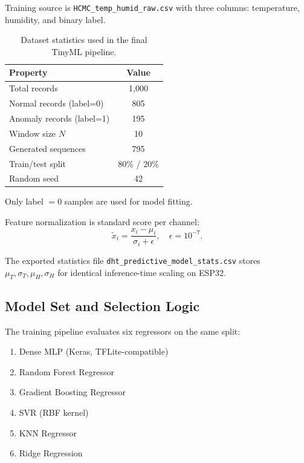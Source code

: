 Training source is \texttt{HCMC\_temp\_humid\_raw.csv} with three
columns: temperature, humidity, and binary label.

\begin{table}[H]
\centering
\caption{Dataset statistics used in the final TinyML pipeline.}
\label{tab:data-stats}
\renewcommand{\arraystretch}{1.25}
\begin{tabular}{l c}
    \toprule
    \textbf{Property} & \textbf{Value} \\
    \midrule
    Total records              & 1,000 \\
    Normal records (label=0)   & 805 \\
    Anomaly records (label=1)  & 195 \\
    Window size $N$            & 10 \\
    Generated sequences        & 795 \\
    Train/test split           & 80\% / 20\% \\
    Random seed                & 42 \\
    \bottomrule
\end{tabular}
\end{table}

Only label $=0$ samples are used for model fitting.

Feature normalization is standard score per channel:
\begin{equation}
\label{eq:zscore}
\tilde{x}_i = \frac{x_i - \mu_i}{\sigma_i + \epsilon}, \quad \epsilon=10^{-7}.
\end{equation}

The exported statistics file
\texttt{dht\_predictive\_model\_stats.csv} stores
$\mu_T, \sigma_T, \mu_H, \sigma_H$ for identical inference-time scaling
on ESP32.

\subsection{Model Set and Selection Logic}
\label{sec:tinyml-models}

The training pipeline evaluates six regressors on the same split:
\begin{enumerate}
    \item Dense MLP (Keras, TFLite-compatible)
    \item Random Forest Regressor
    \item Gradient Boosting Regressor
    \item SVR (RBF kernel)
    \item KNN Regressor
    \item Ridge Regression
\end{enumerate}


